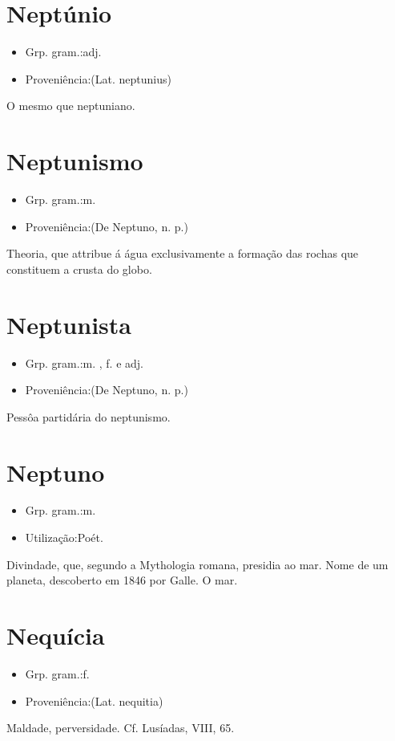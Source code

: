 \section{Neptúnio}
\begin{itemize}
\item {Grp. gram.:adj.}
\end{itemize}
\begin{itemize}
\item {Proveniência:(Lat. \textunderscore neptunius\textunderscore )}
\end{itemize}
O mesmo que \textunderscore neptuniano\textunderscore .
\section{Neptunismo}
\begin{itemize}
\item {Grp. gram.:m.}
\end{itemize}
\begin{itemize}
\item {Proveniência:(De \textunderscore Neptuno\textunderscore , n. p.)}
\end{itemize}
Theoria, que attribue á água exclusivamente a formação das rochas que constituem a crusta do globo.
\section{Neptunista}
\begin{itemize}
\item {Grp. gram.:m. ,  f.  e  adj.}
\end{itemize}
\begin{itemize}
\item {Proveniência:(De \textunderscore Neptuno\textunderscore , n. p.)}
\end{itemize}
Pessôa partidária do neptunismo.
\section{Neptuno}
\begin{itemize}
\item {Grp. gram.:m.}
\end{itemize}
\begin{itemize}
\item {Utilização:Poét.}
\end{itemize}
Divindade, que, segundo a Mythologia romana, presidia ao mar.
Nome de um planeta, descoberto em 1846 por Galle.
O mar.
\section{Nequícia}
\begin{itemize}
\item {Grp. gram.:f.}
\end{itemize}
\begin{itemize}
\item {Proveniência:(Lat. \textunderscore nequitia\textunderscore )}
\end{itemize}
Maldade, perversidade. Cf. \textunderscore Lusíadas\textunderscore , VIII, 65.
